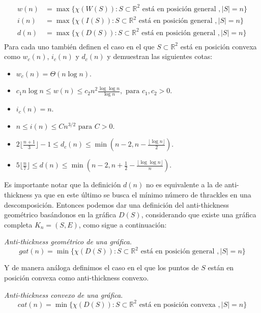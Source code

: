   \begin{align*}
    w(n) &= \max\{\chi(W(S)): S\subset \mathbb{R}^2 \text{ está en posición general }, |S|=n\} \\
    i(n) &= \max\{\chi(I(S)): S\subset \mathbb{R}^2 \text{ está en posición general }, |S|=n\} \\
    d(n) &= \max\{\chi(D(S)): S\subset \mathbb{R}^2 \text{ está en posición general }, |S|=n\} \\
  \end{align*}
Para cada uno también definen el caso en el que $S \subset \mathbb{R}^2$ está
en posición convexa como $w_c(n)$, $i_c(n)$ y $d_c(n)$ y demuestran las siguientes cotas:
\begin{itemize}
  \item $w_c(n) = \Theta(n\log n)$.
  \item $c_1n\log n \leq w(n) \leq c_2 n^2 \frac{\log\log n}{\log n}, \text{ para } c_1,c_2 > 0$.
  \item $i_c(n) = n$.
  \item $n \leq i(n) \leq Cn^{3/2} \text{ para } C > 0$.
  \item $2\lfloor \frac{n+1}{3}\rfloor -1 \leq d_c(n) \leq \min\left( n-2, n - \frac{\lfloor{\log n}\rfloor}{2}\right)$.
  \item $5\lfloor \frac{n}{7}\rfloor \leq d(n) \leq \min\left(n-2,n+\frac{1}{2}- \frac{\lfloor{\log \log n}\rfloor}{n}\right)$.
\end{itemize}
Es importante notar que la definición $d(n)$ no es equivalente a la de anti-thickness
ya que en este último se busca el mínimo número de thrackles en una descomposición.
Entonces podemos dar una definición del anti-thickness geométrico basándonos en la gráfica $D(S)$,
considerando que existe una gráfica completa $K_n = (S,E)$, como sigue a continuación:
\begin{definition}{\emph{Anti-thickness geométrico de una gráfica}.}
  \[gat(n) = \min\{\chi(D(S)): S\subset \mathbb{R}^2 \text{ está en posición general }, |S|=n\}\]
\end{definition}

Y de manera análoga definimos el caso en el que los puntos de $S$ están en posición convexa como
anti-thickness convexo.

\begin{definition}{\emph{Anti-thickness convexo de una gráfica}.}
  \[cat(n) = \min\{\chi(D(S)): S\subset \mathbb{R}^2 \text{ está en posición convexa }, |S|=n\}\]
\end{definition}

